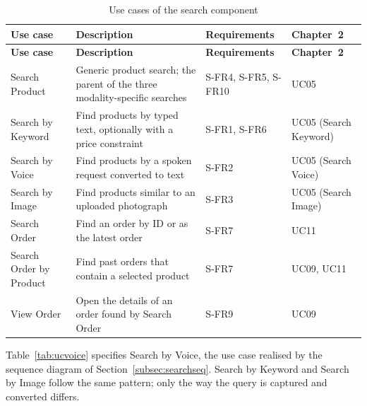 {\small
\begin{xltabular}{\textwidth}{@{}L{3.3cm} Y L{2.1cm} L{2.2cm}@{}}
\caption{Use cases of the search component}\label{tab:searchuc}\\
\toprule
\textbf{Use case} & \textbf{Description} & \textbf{Requirements} & \textbf{Chapter~2} \\ \midrule
\endfirsthead
\toprule
\textbf{Use case} & \textbf{Description} & \textbf{Requirements} & \textbf{Chapter~2} \\ \midrule
\endhead
\bottomrule
\endlastfoot
Search Product & Generic product search; the parent of the three modality-specific searches & S-FR4, S-FR5, S-FR10 & UC05 \\
Search by Keyword & Find products by typed text, optionally with a price constraint & S-FR1, S-FR6 & UC05 (Search Keyword) \\
Search by Voice & Find products by a spoken request converted to text & S-FR2 & UC05 (Search Voice) \\
Search by Image & Find products similar to an uploaded photograph & S-FR3 & UC05 (Search Image) \\
Search Order & Find an order by ID or as the latest order & S-FR7 & UC11 \\
Search Order by Product & Find past orders that contain a selected product & S-FR7 & UC09, UC11 \\
View Order & Open the details of an order found by Search Order & S-FR9 & UC09 \\
\end{xltabular}
}

Table~\ref{tab:ucvoice} specifies Search by Voice, the use case realised by the sequence diagram of Section~\ref{subsec:searchseq}. Search by Keyword and Search by Image follow the same pattern; only the way the query is captured and converted differs.

